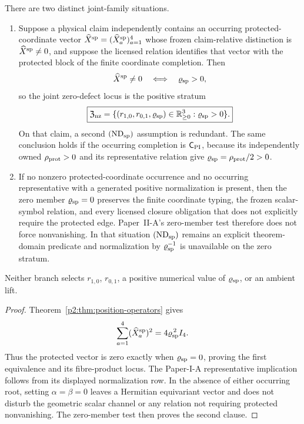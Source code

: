 \documentclass[12pt,a4paper]{article}
\begin{document}
\begin{corollary}
\label{p2c:cor:joint-nondegeneracy-discharge}
There are two distinct joint-family situations.
\begin{enumerate}[label=(\roman*),leftmargin=2.2em]
\item Suppose a physical claim independently contains an occurring
protected-coordinate vector
\(\widehat X^{\rm sp}=(\widehat X_a^{\rm sp})_{a=1}^{4}\) whose frozen
claim-relative distinction is
\(\widehat X^{\rm sp}\neq0\), and suppose the licensed relation identifies
that vector with the protected block of the finite coordinate completion.
Then
\[
 \widehat X^{\rm sp}\neq0
 \quad\Longleftrightarrow\quad
 \varrho_{\rm sp}>0,
\]
so the joint zero-defect locus is the positive stratum
\[
 \boxed{\mathfrak Z_{\rm nz}
 =\{(r_{1,0},r_{0,1},\varrho_{\rm sp})
       \in\mathbb R_{\geq0}^{3}:\varrho_{\rm sp}>0\}.}
\]
On that claim, a second \((\mathrm{ND}_{\rm sp})\) assumption is redundant.
The same conclusion holds if the occurring completion is
\(\mathsf C_{\rm PI}\), because its independently owned
\(\rho_{\rm prot}>0\) and its representative relation give
\(\varrho_{\rm sp}=\rho_{\rm prot}/2>0\).
\item If no nonzero protected-coordinate occurrence and no occurring
representative with a generated positive normalization is present, then the
zero member \(\varrho_{\rm sp}=0\) preserves the finite coordinate typing,
the frozen scalar-symbol relation, and every licensed closure obligation that
does not explicitly require the protected edge.  Paper~II-A's zero-member
test therefore does not force nonvanishing.  In that situation
\((\mathrm{ND}_{\rm sp})\) remains an explicit theorem-domain predicate and
normalization by \(\varrho_{\rm sp}^{-1}\) is unavailable on the zero stratum.
\end{enumerate}
Neither branch selects \(r_{1,0}\), \(r_{0,1}\), a positive numerical value of
\(\varrho_{\rm sp}\), or an ambient lift.
\end{corollary}

\begin{proof}
Theorem~\ref{p2:thm:position-operators} gives
\[
 \sum_{a=1}^{4}(\widehat X_a^{\rm sp})^2
 =4\varrho_{\rm sp}^{\,2}I_4.
\]
Thus the protected vector is zero exactly when
\(\varrho_{\rm sp}=0\), proving the first equivalence and its fibre-product
locus.  The Paper-I-A representative implication follows from its displayed
normalization row.  In the absence of either occurring root, setting
\(\alpha=\beta=0\) leaves a Hermitian equivariant vector and does not disturb
the geometric scalar channel or any relation not requiring protected
nonvanishing.  The zero-member test then proves the second clause.
\end{proof}
\end{document}
